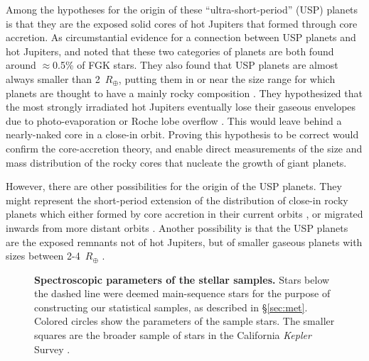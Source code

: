\documentclass[twocolumn]{aastex6}
\begin{document}
Among the hypotheses for the origin of these ``ultra-short-period''
(USP) planets is that they are the exposed solid cores of hot Jupiters
that formed through core accretion. As circumstantial evidence for a
connection between USP planets and hot Jupiters, \citet{SanchisOjeda+2014}
and \citet{SteffenCoughlin2016} noted that these two categories of
planets are both found around $\approx$0.5\% of FGK stars. They also
found that USP planets are almost always smaller than 2~$R_\oplus$,
putting them in or near the size range for which planets are thought
to have a mainly rocky composition \citep{WeissMarcy2014,Rogers2015}.
They hypothesized that the most strongly irradiated hot Jupiters
eventually lose their gaseous envelopes due to photo-evaporation or
Roche lobe overflow \citep{Valsecchi+2014}.  This would leave behind a
nearly-naked core in a close-in orbit.  Proving this hypothesis to be
correct would confirm the core-accretion theory, and enable direct
measurements of the size and mass distribution of the rocky cores that
nucleate the growth of giant planets.

However, there are other possibilities for the origin of the USP
planets. They might represent the short-period extension of the
distribution of close-in rocky planets which either formed by core
accretion in their current orbits \citep{ChiangLaughlin2013}, or
migrated inwards from more distant orbits \citep{IdaLin2004,
  Schlaufman+2010, Terquem2014}. Another possibility is that the USP
planets are the exposed remnants not of hot Jupiters, but of smaller
gaseous planets with sizes between 2-4~$R_\oplus$
\citep{Lundkvist+2016,LeeChiang2017}.

\begin{figure*}[ht!]
 \begin{center}
 \leavevmode
 \end{center}
 \vspace{-0.25in}
  \caption{ {\bf Spectroscopic parameters of the stellar samples.}
    Stars below the dashed line were deemed main-sequence stars for
    the purpose of constructing our statistical samples, as described
    in \S\ref{sec:met}. Colored circles show the parameters of the
    sample stars. The smaller squares are the broader sample of
    stars in the California {\it Kepler} Survey
    \citep{Petigura+2017}.}
  \label{fig:teff_logg}
\end{figure*}
\end{document}
